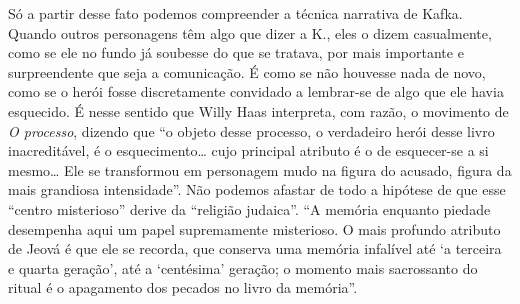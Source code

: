 Só a partir desse fato podemos compreender a técnica narrativa de Kafka.
Quando outros personagens têm algo que dizer a K., eles o dizem
casualmente, como se ele no fundo já soubesse do que se tratava, por
mais importante e surpreendente que seja a comunicação. É como se não
houvesse nada de novo, como se o herói fosse discretamente convidado a
lembrar-se de algo que ele havia esquecido. É nesse sentido que Willy
Haas interpreta, com razão, o movimento de \textit{O processo}, dizendo que ``o
objeto desse processo, o verdadeiro herói desse livro inacreditável, é o
esquecimento\ldots{} cujo principal atributo é o de esquecer-se a si mesmo\ldots{}
Ele se transformou em personagem mudo na figura do acusado, figura da
mais grandiosa intensidade''. Não podemos afastar de todo a hipótese de
que esse ``centro misterioso'' derive da ``religião judaica''. ``A
memória enquanto piedade desempenha aqui um papel supremamente
misterioso. O mais profundo atributo de Jeová é que ele se recorda, que
conserva uma memória infalível até `a terceira e quarta geração', até a
`centésima' geração; o momento mais sacrossanto do ritual é o apagamento
dos pecados no livro da memória''.

